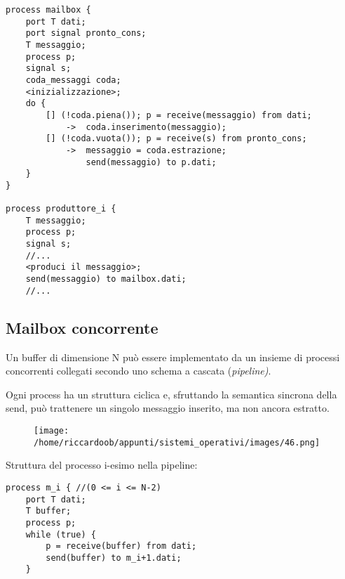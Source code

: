 \begin{verbatim}
process mailbox {
    port T dati;
    port signal pronto_cons;
    T messaggio;
    process p;
    signal s;
    coda_messaggi coda;
    <inizializzazione>;
    do {
        [] (!coda.piena()); p = receive(messaggio) from dati;
            ->  coda.inserimento(messaggio);
        [] (!coda.vuota()); p = receive(s) from pronto_cons;
            ->  messaggio = coda.estrazione;
                send(messaggio) to p.dati;
    }
}

process produttore_i {
    T messaggio;
    process p;
    signal s;
    //...
    <produci il messaggio>;
    send(messaggio) to mailbox.dati;
    //...
\end{verbatim}

\subsection{Mailbox concorrente}
Un buffer di dimensione N può essere implementato da un insieme di processi concorrenti collegati secondo uno schema a cascata (\textit{pipeline)}.

Ogni process ha un struttura ciclica e, sfruttando la semantica sincrona della send, può trattenere un singolo messaggio inserito, ma non ancora estratto.

\begin{figure}[H]
    \centering
    \texttt{[image: /home/riccardoob/appunti/sistemi\_operativi/images/46.png]}
\end{figure}

Struttura del processo i-esimo nella pipeline:
\begin{verbatim}
process m_i { //(0 <= i <= N-2)
    port T dati;
    T buffer;
    process p;
    while (true) {
        p = receive(buffer) from dati;
        send(buffer) to m_i+1.dati;
    }
\end{verbatim}

